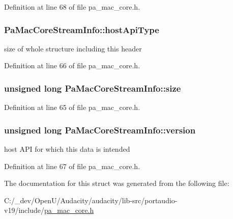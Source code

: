 Definition at line 68 of file pa\+\_\+mac\+\_\+core.\+h.

\subsubsection[{\texorpdfstring{host\+Api\+Type}{hostApiType}}]{ Pa\+Mac\+Core\+Stream\+Info\+::host\+Api\+Type}\hypertarget{struct_pa_mac_core_stream_info_a63f4110b767bfbf2fa09b88f3252d91e}{}\label{struct_pa_mac_core_stream_info_a63f4110b767bfbf2fa09b88f3252d91e}
size of whole structure including this header 

Definition at line 66 of file pa\+\_\+mac\+\_\+core.\+h.

\subsubsection[{\texorpdfstring{size}{size}}]{\setlength{\rightskip}{0pt plus 5cm}unsigned long Pa\+Mac\+Core\+Stream\+Info\+::size}\hypertarget{struct_pa_mac_core_stream_info_a6a208a662332f447094b382a00a2a635}{}\label{struct_pa_mac_core_stream_info_a6a208a662332f447094b382a00a2a635}


Definition at line 65 of file pa\+\_\+mac\+\_\+core.\+h.

\subsubsection[{\texorpdfstring{version}{version}}]{\setlength{\rightskip}{0pt plus 5cm}unsigned long Pa\+Mac\+Core\+Stream\+Info\+::version}\hypertarget{struct_pa_mac_core_stream_info_ad5ef9592026b8e98f2bf17a61677b064}{}\label{struct_pa_mac_core_stream_info_ad5ef9592026b8e98f2bf17a61677b064}
host A\+PI for which this data is intended 

Definition at line 67 of file pa\+\_\+mac\+\_\+core.\+h.



The documentation for this struct was generated from the following file\+:\begin{DoxyCompactItemize}
\item 
C\+:/\+\_\+dev/\+Open\+U/\+Audacity/audacity/lib-\/src/portaudio-\/v19/include/\hyperlink{pa__mac__core_8h}{pa\+\_\+mac\+\_\+core.\+h}\end{DoxyCompactItemize}
